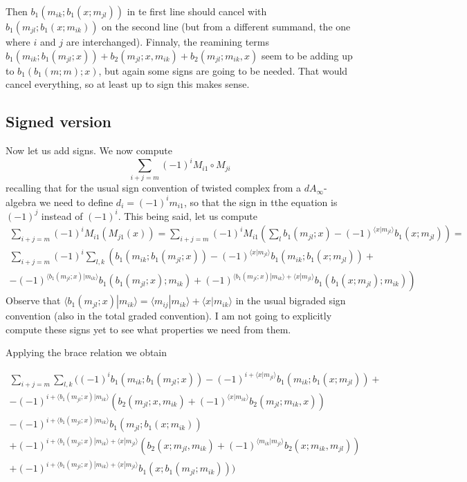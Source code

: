 \documentclass[twoside]{article}
\begin{document}
Then $b_1(m_{ik};b_1(x;m_{jl}))$ in te first line should cancel with $b_1(m_{jl};b_1(x;m_{ik}))$ on the second line (but from a different summand, the one where $i$ and $j$ are interchanged). Finnaly, the reamining terms $b_1(m_{ik}; b_1(m_{jl};x))+b_2(m_{jl};x,m_{ik})+b_2(m_{jl};m_{ik},x)$ seem to be adding up to $b_1(b_1(m;m);x)$, but again some signs are going to be needed. That would cancel everything, so at least up to sign this makes sense.


\subsection{Signed version}

Now let us add signs. We now compute 
\[\sum_{i+j=m} (-1)^iM_{i1}\circ M_{ji}\]
recalling that for the usual sign convention of twisted complex from a $dA_\infty$-algebra we need to define $d_i=(-1)^im_{i1}$, so that the sign in tthe equation is $(-1)^j$ instead of $(-1)^i$. This being said, let us compute 
\begin{align*}
\sum_{i+j=m}(-1)^iM_{i1}(M_{j1}(x))=\sum_{i+j=m}(-1)^iM_{i1}\left(\sum_l b_1(m_{jl};x)-(-1)^{\langle x|m_{jl}\rangle}b_1(x;m_{jl})\right)=\\
\sum_{i+j=m}(-1)^i\sum_{l,k}\left(b_1(m_{ik}; b_1(m_{jl};x))-(-1)^{\langle x|m_{jl}\rangle}b_1(m_{ik};b_1(x;m_{jl}))+\right.\\
\left. -(-1)^{\langle b_1(m_{jl};x)|m_{ik}\rangle}b_1(b_1(m_{jl};x);m_{ik})+(-1)^{\langle b_1(m_{jl};x)|m_{ik}\rangle+\langle x|m_{jl}\rangle}b_1(b_1(x;m_{jl});m_{ik})\right)
\end{align*}
Observe that $\langle b_1(m_{jl};x)|m_{ik}\rangle=\langle m_{ij}|m_{ik}\rangle+\langle x|m_{ik}\rangle$ in the usual bigraded sign convention (also in the total graded convention). I am not going to explicitly compute these signs yet to see what properties we need from them.

Applying the brace relation we obtain

\begin{align*}
\sum_{i+j=m}\sum_{l,k}((-1)^ib_1(m_{ik}; b_1(m_{jl};x))-(-1)^{i+\langle x|m_{jl}\rangle}b_1(m_{ik};b_1(x;m_{jl}))+\\
 -(-1)^{i+\langle b_1(m_{jl};x)|m_{ik}\rangle}(b_2(m_{jl};x,m_{ik})+(-1)^{\langle x|m_{ik}\rangle}b_2(m_{jl};m_{ik},x))\\
 -(-1)^{i+\langle b_1(m_{jl};x)|m_{ik}\rangle}b_1(m_{jl};b_1(x;m_{ik}))\\
+(-1)^{i+\langle b_1(m_{jl};x)|m_{ik}\rangle+\langle x|m_{jl}\rangle}(b_2(x;m_{jl},m_{ik})+(-1)^{\langle m_{ik}|m_{jl}\rangle}b_2(x;m_{ik},m_{jl}))\\
+(-1)^{i+\langle b_1(m_{jl};x)|m_{ik}\rangle+\langle x|m_{jl}\rangle}b_1(x;b_1(m_{jl};m_{ik})))
\end{align*}
\end{document}
